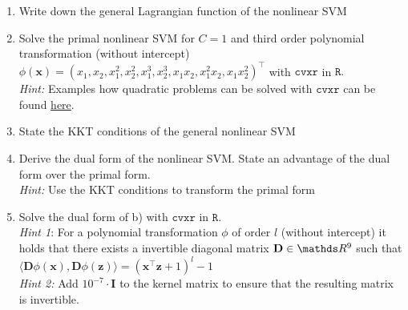 \documentclass[a4paper]{article}
\begin{document}
{\begin{enumerate}
\item Write down the general Lagrangian function of the nonlinear SVM
\item Solve the primal nonlinear SVM for $C=1$ and third order polynomial transformation (without intercept) $\phi(\mathbf{x}) = (x_1, x_2, x_1^2, x_2^2, x_1^3, x_2^3, x_1x_2, x_1^2x_2, x_1x_2^2)^\top$ with $\texttt{cvxr}$ in $\texttt{R}.$ \\
\textit{Hint:} Examples how quadratic problems can be solved with $\texttt{cvxr}$ can be found \href{http://www.di.fc.ul.pt/~jpn/r/optimization/CVXR.html#quadratic-programming}{here}.
\item State the KKT conditions of the general nonlinear SVM
\item Derive the dual form of the nonlinear SVM. State an advantage of the dual form over the primal form. \\
\textit{Hint:} Use the KKT conditions to transform the primal form
\item Solve the dual form of b) with $\texttt{cvxr}$ in $\texttt{R}.$ \\
\textit{Hint 1}: For a polynomial transformation $\phi$ of order $l$ (without intercept) it holds that there exists a invertible diagonal matrix $\mathbf{D} \in \R^9$ such that $\langle \mathbf{D}\phi(\mathbf{x}), \mathbf{D}\phi(\mathbf{z})\rangle = (\mathbf{x}^\top\mathbf{z} + 1)^l - 1$ \\
\textit{Hint 2:} Add $10^{-7} \cdot \mathbf{I}$ to the kernel matrix to ensure that the resulting matrix is invertible. \\


\end{enumerate}
}
\end{document}
